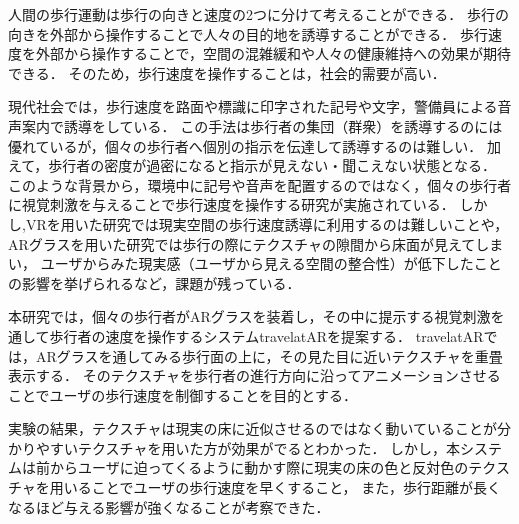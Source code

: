
人間の歩行運動は歩行の向きと速度の2つに分けて考えることができる．
歩行の向きを外部から操作することで人々の目的地を誘導することができる．
歩行速度を外部から操作することで，空間の混雑緩和や人々の健康維持への効果が期待できる．
そのため，歩行速度を操作することは，社会的需要が高い．

現代社会では，歩行速度を路面や標識に印字された記号や文字，警備員による音声案内で誘導をしている．
この手法は歩行者の集団（群衆）を誘導するのには優れているが，個々の歩行者へ個別の指示を伝達して誘導するのは難しい．
加えて，歩行者の密度が過密になると指示が見えない・聞こえない状態となる．
このような背景から，環境中に記号や音声を配置するのではなく，個々の歩行者に視覚刺激を与えることで歩行速度を操作する研究が実施されている．
しかし,VRを用いた研究では現実空間の歩行速度誘導に利用するのは難しいことや，
ARグラスを用いた研究では歩行の際にテクスチャの隙間から床面が見えてしまい，
ユーザからみた現実感（ユーザから見える空間の整合性）が低下したことの影響を挙げられるなど，課題が残っている．


本研究では，個々の歩行者がARグラスを装着し，その中に提示する視覚刺激を通して歩行者の速度を操作するシステムtravelatARを提案する．
travelatARでは，ARグラスを通してみる歩行面の上に，その見た目に近いテクスチャを重畳表示する．
そのテクスチャを歩行者の進行方向に沿ってアニメーションさせることでユーザの歩行速度を制御することを目的とする．


実験の結果，テクスチャは現実の床に近似させるのではなく動いていることが分かりやすいテクスチャを用いた方が効果がでるとわかった．
しかし，本システムは前からユーザに迫ってくるように動かす際に現実の床の色と反対色のテクスチャを用いることでユーザの歩行速度を早くすること，
また，歩行距離が長くなるほど与える影響が強くなることが考察できた．
